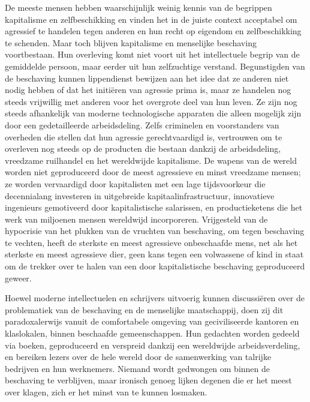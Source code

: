 De meeste mensen hebben waarschijnlijk weinig kennis van de begrippen kapitalisme en zelfbeschikking en vinden het in de juiste context acceptabel om agressief te handelen tegen anderen en hun recht op eigendom en zelfbeschikking te schenden. Maar toch blijven kapitalisme en menselijke beschaving voortbestaan. Hun overleving komt niet voort uit het intellectuele begrip van de gemiddelde persoon, maar eerder uit hun zelfzuchtige verstand. Begunstigden van de beschaving kunnen lippendienst bewijzen aan het idee dat ze anderen niet nodig hebben of dat het initiëren van agressie prima is, maar ze handelen nog steeds vrijwillig met anderen voor het overgrote deel van hun leven. Ze zijn nog steeds afhankelijk van moderne technologische apparaten die alleen mogelijk zijn door een gedetailleerde arbeidsdeling. Zelfs criminelen en voorstanders van overheden die stellen dat hun agressie gerechtvaardigd is, vertrouwen om te overleven nog steeds op de producten die bestaan dankzij de arbeidsdeling, vreedzame ruilhandel en het wereldwijde kapitalisme. De wapens van de wereld worden niet geproduceerd door de meest agressieve en minst vreedzame mensen; ze worden vervaardigd door kapitalisten met een lage tijdsvoorkeur die decennialang investeren in uitgebreide kapitaalinfrastructuur, innovatieve ingenieurs gemotiveerd door kapitalistische salarissen, en productieketens die het werk van miljoenen mensen wereldwijd incorporeren. Vrijgesteld van de hypocrisie van het plukken van de vruchten van beschaving, om tegen beschaving te vechten, heeft de sterkste en meest agressieve onbeschaafde mens, net als het sterkste en meest agressieve dier, geen kans tegen een volwassene of kind in staat om de trekker over te halen van een door kapitalistische beschaving geproduceerd geweer.

Hoewel moderne intellectuelen en schrijvers uitvoerig kunnen discussiëren over de problematiek van de beschaving en de menselijke maatschappij, doen zij dit paradoxalerwijs vanuit de comfortabele omgeving van geciviliseerde kantoren en klaslokalen, binnen beschaafde gemeenschappen. Hun gedachten worden gedeeld via boeken, geproduceerd en verspreid dankzij een wereldwijde arbeidsverdeling, en bereiken lezers over de hele wereld door de samenwerking van talrijke bedrijven en hun werknemers. Niemand wordt gedwongen om binnen de beschaving te verblijven, maar ironisch genoeg lijken degenen die er het meest over klagen, zich er het minst van te kunnen losmaken.

